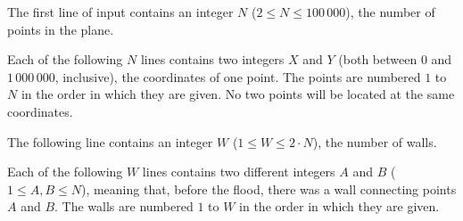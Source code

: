 The first line of input contains an integer $N$ ($2 \le N \le 100\,000$), the number of points in the plane.

Each of the following $N$ lines contains two integers $X$ and $Y$ (both between $0$ and $1\,000\,000$, inclusive), the coordinates of one point. The points are numbered $1$ to $N$ in the order in which they are given. No two points will be located at the same coordinates.

The following line contains an integer $W$ ($1 \le W \le 2 \cdot N$), the number of walls.

Each of the following $W$ lines contains two different integers $A$ and $B$ ($1 \le A, B \le N$), meaning that, before the flood, there was a wall connecting points $A$ and $B$. The walls are numbered $1$ to $W$ in the order in which they are given.